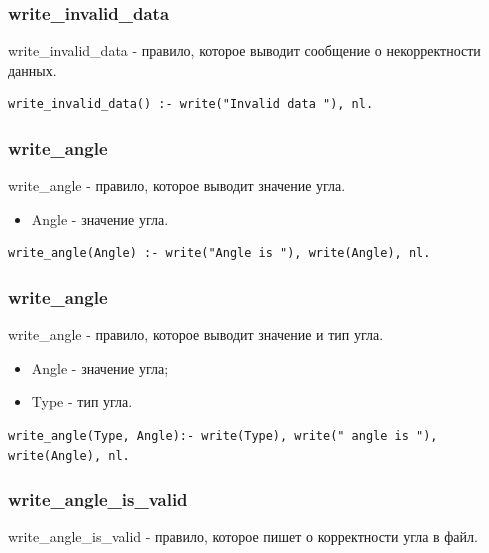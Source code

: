 \subsubsection{write\_invalid\_data}
\hspace{0.6cm} write\_invalid\_data - правило, которое выводит сообщение о некорректности данных.

\begin{lstlisting}[caption=Реализация правила write\_invalid\_data, label=rules:writeinvaliddata]
write_invalid_data() :- write("Invalid data "), nl.
\end{lstlisting}

\subsubsection{write\_angle}
\hspace{0.6cm} write\_angle - правило, которое выводит значение угла.

\begin{itemize}
	\item Angle - значение угла.
\end{itemize}

\begin{lstlisting}[caption=Реализация правила write\_angle, label=rules:writeangle]
write_angle(Angle) :- write("Angle is "), write(Angle), nl.
\end{lstlisting}

\subsubsection{write\_angle}
\hspace{0.6cm} write\_angle - правило, которое выводит значение и тип угла.

\begin{itemize}
	\item Angle - значение угла;
	\item Type - тип угла.
\end{itemize}

\begin{lstlisting}[caption=Реализация правила write\_angle, label=rules:writeangle]
write_angle(Type, Angle):- write(Type), write(" angle is "), write(Angle), nl.
\end{lstlisting}

\subsubsection{write\_angle\_is\_valid}
\hspace{0.6cm} write\_angle\_is\_valid - правило, которое пишет о корректности угла в файл.

